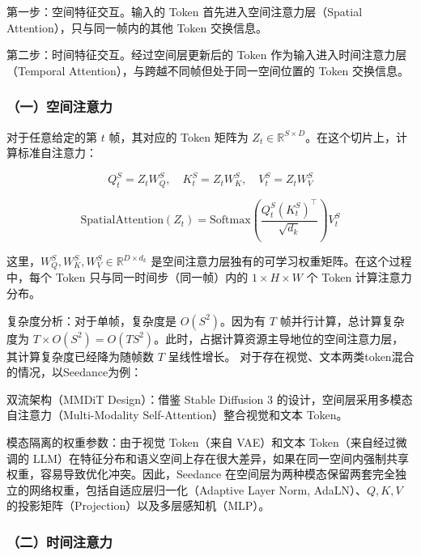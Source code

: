 第一步：空间特征交互。输入的 Token 首先进入空间注意力层（Spatial Attention），只与同一帧内的其他 Token 交换信息。

第二步：时间特征交互。经过空间层更新后的 Token 作为输入进入时间注意力层（Temporal Attention），与跨越不同帧但处于同一空间位置的 Token 交换信息。

\hypertarget{ux4e00ux7a7aux95f4ux6ce8ux610fux529b}{%
\subsubsection{（一）空间注意力}\label{ux4e00ux7a7aux95f4ux6ce8ux610fux529b}}

对于任意给定的第 \(t\) 帧，其对应的 Token 矩阵为 \(Z_t\in\mathbb{R}^{S\times D}\)。在这个切片上，计算标准自注意力：

\[
Q_t^S=Z_tW_Q^S,\quad K_t^S=Z_tW_K^S,\quad V_t^S=Z_tW_V^S
\]

\[
\mathrm{SpatialAttention}(Z_t)=\mathrm{Softmax}\left(\frac{Q_t^S(K_t^S)^\top}{\sqrt{d_k}}\right)V_t^S
\]

这里，\(W_Q^S,W_K^S,W_V^S\in\mathbb{R}^{D\times d_k}\) 是空间注意力层独有的可学习权重矩阵。在这个过程中，每个 Token 只与同一时间步（同一帧）内的 \(1\times H\times W\) 个 Token 计算注意力分布。

复杂度分析：对于单帧，复杂度是 \(O(S^2)\)。因为有 \(T\) 帧并行计算，总计算复杂度为 \(T\times O(S^2)=O(TS^2)\)。此时，占据计算资源主导地位的空间注意力层，其计算复杂度已经降为随帧数 \(T\) 呈线性增长。
对于存在视觉、文本两类token混合的情况，以Seedance为例：

双流架构（MMDiT Design）：借鉴 Stable Diffusion 3 的设计，空间层采用多模态自注意力（Multi-Modality Self-Attention）整合视觉和文本 Token。

模态隔离的权重参数：由于视觉 Token（来自 VAE）和文本 Token（来自经过微调的 LLM）在特征分布和语义空间上存在很大差异，如果在同一空间内强制共享权重，容易导致优化冲突。因此，Seedance 在空间层为两种模态保留两套完全独立的网络权重，包括自适应层归一化（Adaptive Layer Norm, AdaLN）、\(Q,K,V\) 的投影矩阵（Projection）以及多层感知机（MLP）。

\hypertarget{ux4e8cux65f6ux95f4ux6ce8ux610fux529b}{%
\subsubsection{（二）时间注意力}\label{ux4e8cux65f6ux95f4ux6ce8ux610fux529b}}

